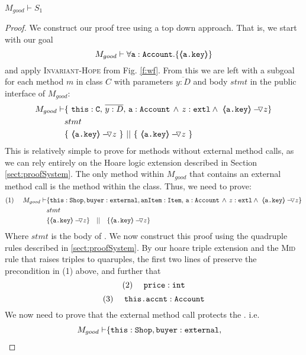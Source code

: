 \begin{lemma}
$M_{good} \vdash S_1$
\end{lemma}
\begin{proof}
We construct our proof tree using a top down approach.  That is, we start with our goal
$$M_{good} \vdash \forall {\mbox{\normalfont{\texttt{a}}}:\mbox{\normalfont{\texttt{Account}}}}.{{\{}}{\langle\!\!\langle \mbox{\normalfont{\texttt{\mbox{\normalfont{\texttt{a.key}}}}}} \rangle\!\!\rangle}{{\}}}$$
and apply  \textsc{Invariant-Hope} from Fig. \ref{f:wf}.
From this we are left with a subgoal for each method $m$ in  class $C$ with parameters $\overline{y:D}$ and body $stmt$ in the public interface of $M_{good}$:
\small
\begin{align*}
M_{good} \vdash
		& \{ \ \prg{this}:\prg{C},\, \overline{y:D},\, \prg{a}:\prg{Account}\, \wedge\, 
\external z \wedge\ {\PushASLong {z} {\inside{\prg{a.key}}}}\} \\
		& stmt\ \\
		& \{\ {\PushASLong {z} {\inside{\prg{a.key}}}}\ \}\ ||\ \{\ {\PushASLong {z} {\inside{\prg{a.key}}}} \ 			\} 
\end{align*}
\normalsize
This is relatively simple to prove for methods without external method calls, as we can rely entirely on the Hoare logic extension described in Section \ref{sect:proofSystem}. The only  method within $M_{good}$ that contains 
an external method call is  the  method within the  class. Thus, we need to prove:
\small
\begin{align*}
\text{(1)}  \ \ \ \ M_{good} \vdash & \{  \prg{this}:\prg{Shop}, \prg{buyer} : \prg{external}, \prg{anItem} : \prg{Item},\, \prg{a}:\prg{Account}\,\wedge\, \external z \wedge\ {\PushASLong {z} {\inside{\prg{a.key}}}} \} \\
		  &stmt\ \\  &\{ {\PushASLong {z} {\inside{\prg{a.key}}}} \} \ \ \  || \ \ \ \{ {\PushASLong {z} {\inside{\prg{a.key}}}} \}
\end{align*}
\normalsize
Where $stmt$ is the body of . We now construct this proof using the quadruple rules described in \ref{sect:proofSystem}. By our hoare triple extension and the \textsc{Mid} rule that raises triples to quaruples, the first two lines
of  preserve the precondition in (1) above, and further that 
\small
$$
\text{(2)} \ \ \ \ \mbox{\normalfont{\texttt{price}}} : \mbox{\normalfont{\texttt{int}}}
$$ 
$$
\text{(3)} \ \ \ \ \prg{this.accnt} : \prg{Account}
$$ 
We now need to prove that the external method call  protects the . i.e.
\small
\begin{align*}
M_{good} \vdash & \{  \prg{this}:\prg{Shop}, \prg{buyer} : \prg{external}, 

\end{align*}
\end{proof}
